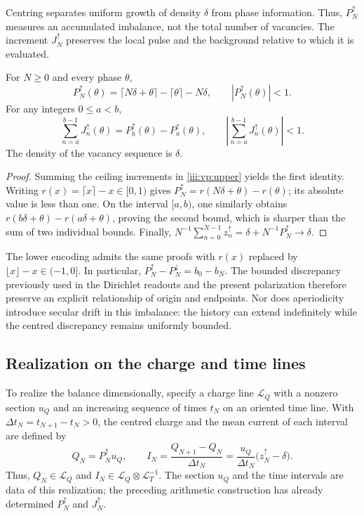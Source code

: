 Centring separates uniform growth of density $\delta$ from
phase information. Thus, $P_N^{\uparrow}$ measures an accumulated imbalance,
not the total number of vacancies. The increment $J_N^{\uparrow}$ preserves
the local pulse and the background relative to which it is evaluated.

\begin{theorem}
For $N\geq0$ and every phase $\theta$,
\begin{equation}
 P_N^{\uparrow}(\theta)
 =\lceil N\delta+\theta\rceil-\lceil\theta\rceil-N\delta,
 \qquad |P_N^{\uparrow}(\theta)|<1.
 \label{iii:vp:bound}
\end{equation}
For any integers $0\leq a<b$,
\begin{equation}
 \sum_{n=a}^{b-1}J_n^{\uparrow}(\theta)
 =P_b^{\uparrow}(\theta)-P_a^{\uparrow}(\theta),
 \qquad
 \left|\sum_{n=a}^{b-1}J_n^{\uparrow}(\theta)\right|<1.
 \label{iii:vp:continuity}
\end{equation}
The density of the vacancy sequence is $\delta$.
\end{theorem}
\begin{proof}
Summing the ceiling increments in \eqref{iii:vp:upper} yields the
first identity. Writing $r(x)=\lceil x\rceil-x\in[0,1)$
gives $P_N^{\uparrow}=r(N\delta+\theta)-r(\theta)$; its absolute
value is less than one. On the interval $[a,b)$, one similarly obtains
$r(b\delta+\theta)-r(a\delta+\theta)$, proving
the second bound, which is sharper than the sum of two individual bounds.
Finally,
$N^{-1}\sum_{n=0}^{N-1}z_n^{\uparrow}
=\delta+N^{-1}P_N^{\uparrow}\to\delta$.
\end{proof}

The lower encoding admits the same proofs with
$r(x)$ replaced by $\lfloor x\rfloor-x\in(-1,0]$. In particular,
$P_N^{\uparrow}-P_N^{\downarrow}=b_0-b_N$. The bounded discrepancy
previously used in the Dirichlet readouts and the present polarization
therefore preserve an explicit relationship of origin and endpoints.
Nor does aperiodicity introduce secular drift in this imbalance:
the history can extend indefinitely while the centred discrepancy
remains uniformly bounded.

\subsection{Realization on the charge and time lines}

To realize the balance dimensionally, specify a charge line
$\mathcal L_Q$ with a nonzero section $u_Q$ and an increasing sequence of
times $t_N$ on an oriented time line. With
$\Delta t_N=t_{N+1}-t_N>0$, the centred charge and the mean current of
each interval are defined by
\begin{equation}
 Q_N=P_N^{\uparrow}u_Q,\qquad
 I_N=\frac{Q_{N+1}-Q_N}{\Delta t_N}
     =\frac{u_Q}{\Delta t_N}\bigl(z_N^{\uparrow}-\delta\bigr).
 \label{iii:vp:dimensional}
\end{equation}
Thus, $Q_N\in\mathcal L_Q$ and
$I_N\in\mathcal L_Q\otimes\mathcal L_T^{-1}$. The section $u_Q$ and
the time intervals are data of this realization; the preceding arithmetic
construction has already determined $P_N^{\uparrow}$ and
$J_N^{\uparrow}$.

